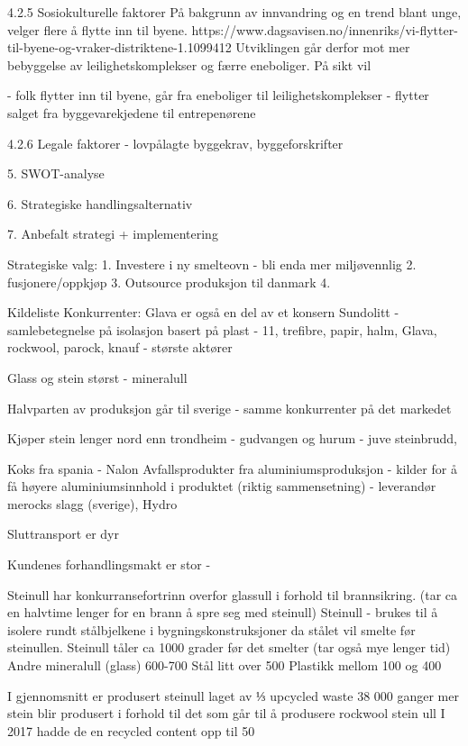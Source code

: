 4.2.5 Sosiokulturelle faktorer 
På bakgrunn av innvandring og en trend blant unge, velger flere å flytte inn til byene. https://www.dagsavisen.no/innenriks/vi-flytter-til-byene-og-vraker-distriktene-1.1099412
Utviklingen går derfor mot mer bebyggelse av leilighetskomplekser og færre eneboliger. På sikt vil 

- folk flytter inn til byene, går fra eneboliger til leilighetskomplekser - flytter salget fra byggevarekjedene til entrepenørene

4.2.6 Legale faktorer - lovpålagte byggekrav, byggeforskrifter

5. SWOT-analyse

6. Strategiske handlingsalternativ

7. Anbefalt strategi + implementering







Strategiske valg:
1. Investere i ny smelteovn - bli enda mer miljøvennlig
2. fusjonere/oppkjøp
3. Outsource produksjon til danmark
4. 


Kildeliste
Konkurrenter:
Glava er også en del av et konsern
Sundolitt - samlebetegnelse på isolasjon basert på plast - 11, trefibre, papir, halm, 
Glava, rockwool, parock, knauf - største aktører

Glass og stein størst - mineralull

Halvparten av produksjon går til sverige - samme konkurrenter på det markedet

Kjøper stein lenger nord enn trondheim - gudvangen og hurum - juve steinbrudd, 

Koks fra spania - Nalon
Avfallsprodukter fra aluminiumsproduksjon - kilder for å få høyere aluminiumsinnhold i produktet (riktig sammensetning) - leverandør merocks slagg (sverige), Hydro



Sluttransport er dyr

Kundenes forhandlingsmakt er stor -

Steinull har konkurransefortrinn overfor glassull i forhold til brannsikring. (tar ca en halvtime lenger for en brann å spre seg med steinull)
Steinull - brukes til å isolere rundt stålbjelkene i bygningskonstruksjoner da stålet vil smelte før steinullen. 
Steinull tåler ca 1000 grader før det smelter (tar også mye lenger tid)
Andre mineralull (glass) 600-700
Stål litt over 500
Plastikk mellom 100 og 400

I gjennomsnitt er produsert steinull laget av ⅓ upcycled waste
38 000 ganger mer stein blir produsert i forhold til det som går til å produsere rockwool stein ull
I 2017 hadde de en recycled content opp til 50 %

